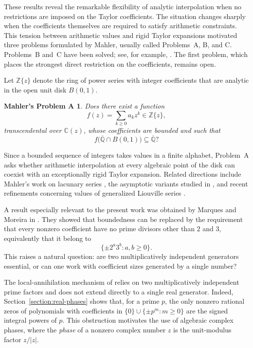 \documentclass[10pt]{amsart}
\newtheorem*{questionA}{Mahler's Problem A}
\theoremstyle{definition}
\theoremstyle{remark}
\numberwithin{equation}{section}
\newcommand{\Z}{\mathbb Z}
\newcommand{\C}{\mathbb C}
\newcommand{\Qbar}{\overline{\mathbb Q}}
\newcommand{\B}{B(0,1)}
\begin{document}
These results reveal the remarkable flexibility of analytic interpolation
when no restrictions are imposed on the Taylor coefficients. The situation
changes sharply when the coefficients themselves are required to satisfy
arithmetic constraints. This tension between arithmetic values and rigid
Taylor expansions motivated three problems formulated by Mahler, usually
called Problems~A, B, and C. Problems~B and~C have been solved; see, for
example, \cite{marquesmoreira2017,marquesmoreira2018}. The first problem,
which places the strongest direct restriction on the coefficients, remains
open.

Let $\Z\{z\}$ denote the ring of power series with integer coefficients that
are analytic in the open unit disk $\B$.

\begin{questionA}\label{question:mahlerA}
Does there exist a function
\[
        f(z)=\sum_{k\geq0}a_kz^k\in\Z\{z\},
\]
transcendental over $\C(z)$, whose coefficients are bounded and such that
\[
        f\bigl(\Qbar\cap\B\bigr)\subseteq\Qbar?
\]
\end{questionA}

Since a bounded sequence of integers takes values in a finite alphabet,
Problem~A asks whether arithmetic interpolation at every algebraic point of
the disk can coexist with an exceptionally rigid Taylor expansion. Related
directions include Mahler's work on lacunary series \cite{mahler1965}, the
asymptotic variants studied in \cite{franciscomarques2023, franciscomarques}, and recent
refinements concerning values of generalized Liouville series
\cite{bilumarquesmoreira2025}.

A result especially relevant to the present work was obtained by Marques and
Moreira in \cite{marquesmoreira2021}. They showed that boundedness can be
replaced by the requirement that every nonzero coefficient have no prime
divisors other than $2$ and $3$, equivalently that it belong to
\[
        \{\pm2^a3^b:a,b\geq0\}.
\]
This raises a natural question: are two multiplicatively independent
generators essential, or can one work with coefficient sizes generated by a
single number?

The local-annihilation mechanism of \cite{marquesmoreira2021} relies on two
multiplicatively independent prime factors and does not extend directly to a
single real generator. Indeed, Section~\ref{section:real-phases} shows that,
for a prime $p$, the only nonzero rational zeros of polynomials with
coefficients in $\{0\}\cup\{\pm p^m:m\geq0\}$ are the signed integral powers
of $p$. This obstruction motivates the use of algebraic complex phases,
where the \textit{phase} of a nonzero complex number $z$ is the unit-modulus factor
$z/|z|$.
\end{document}
